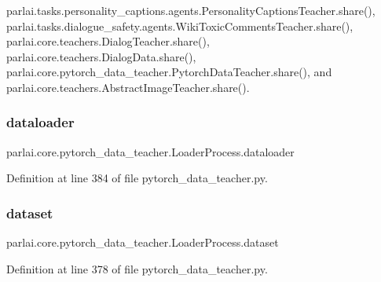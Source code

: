 parlai.\+tasks.\+personality\+\_\+captions.\+agents.\+Personality\+Captions\+Teacher.\+share(), parlai.\+tasks.\+dialogue\+\_\+safety.\+agents.\+Wiki\+Toxic\+Comments\+Teacher.\+share(), parlai.\+core.\+teachers.\+Dialog\+Teacher.\+share(), parlai.\+core.\+teachers.\+Dialog\+Data.\+share(), parlai.\+core.\+pytorch\+\_\+data\+\_\+teacher.\+Pytorch\+Data\+Teacher.\+share(), and parlai.\+core.\+teachers.\+Abstract\+Image\+Teacher.\+share().

\mbox{\label{classparlai_1_1core_1_1pytorch__data__teacher_1_1LoaderProcess_a4ff8637f6f401f1431046ae039c78889}} 
\subsubsection{\texorpdfstring{dataloader}{dataloader}}
{\footnotesize\ttfamily parlai.\+core.\+pytorch\+\_\+data\+\_\+teacher.\+Loader\+Process.\+dataloader}



Definition at line 384 of file pytorch\+\_\+data\+\_\+teacher.\+py.

\mbox{\label{classparlai_1_1core_1_1pytorch__data__teacher_1_1LoaderProcess_abd64da305ebdbd4a506f06c9ab827d6f}} 
\subsubsection{\texorpdfstring{dataset}{dataset}}
{\footnotesize\ttfamily parlai.\+core.\+pytorch\+\_\+data\+\_\+teacher.\+Loader\+Process.\+dataset}



Definition at line 378 of file pytorch\+\_\+data\+\_\+teacher.\+py.



